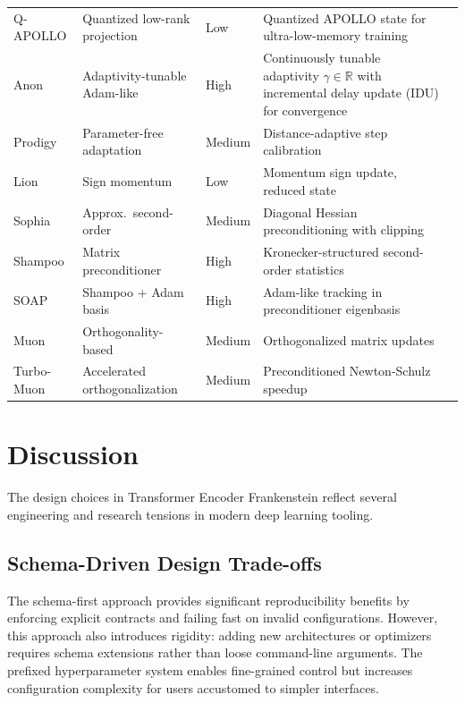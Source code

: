 \documentclass[11pt,a4paper]{article}
\begin{document}
\begin{longtable}{p{2.2cm}p{2.8cm}p{2.0cm}p{5.4cm}p{1.8cm}}
Q-APOLLO & Quantized low-rank projection & Low & Quantized APOLLO state for ultra-low-memory training & \citep{zhu2025apollosgdlikememoryadamwlevel} \\
Anon & Adaptivity-tunable Adam-like & High & Continuously tunable adaptivity $\gamma \in \mathbb{R}$ with incremental delay update (IDU) for convergence & \citep{anon2026anon} \\
Prodigy & Parameter-free adaptation & Medium & Distance-adaptive step calibration & \citep{mishchenko_prodigy_2023} \\
Lion & Sign momentum & Low & Momentum sign update, reduced state & \citep{chen_symbolic_2023} \\
Sophia & Approx.\ second-order & Medium & Diagonal Hessian preconditioning with clipping & \citep{liu_sophia_2023} \\
Shampoo & Matrix preconditioner & High & Kronecker-structured second-order statistics & \citep{gupta_shampoo_2018} \\
SOAP & Shampoo + Adam basis & High & Adam-like tracking in preconditioner eigenbasis & \citep{vyas_soap_2024} \\
Muon & Orthogonality-based & Medium & Orthogonalized matrix updates & \citep{shen_convergence_2025} \\
Turbo-Muon & Accelerated orthogonalization & Medium & Preconditioned Newton-Schulz speedup & \citep{boissin_turbo-muon_2025} \\
\bottomrule
\end{longtable}
\normalsize

\section{Discussion}
\label{sec:discussion}

The design choices in Transformer Encoder Frankenstein reflect several engineering and research tensions in modern deep learning tooling.

\subsection{Schema-Driven Design Trade-offs}

The schema-first approach provides significant reproducibility benefits by enforcing explicit contracts and failing fast on invalid configurations. However, this approach also introduces rigidity: adding new architectures or optimizers requires schema extensions rather than loose command-line arguments. The prefixed hyperparameter system enables fine-grained control but increases configuration complexity for users accustomed to simpler interfaces.
\end{document}
